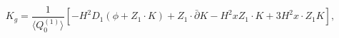 \begin{equation}\label{eq:lek}
K_g=\frac{1}{ \langle Q_{0}^{(1)}\rangle}
\left[-H^{2}D_{1}(\phi+Z_1\cdot K)+ Z_1\cdot\bar\partial
K-H^2xZ_1\cdot K+3H^2 x\cdot Z_1 K \right],
\end{equation}

